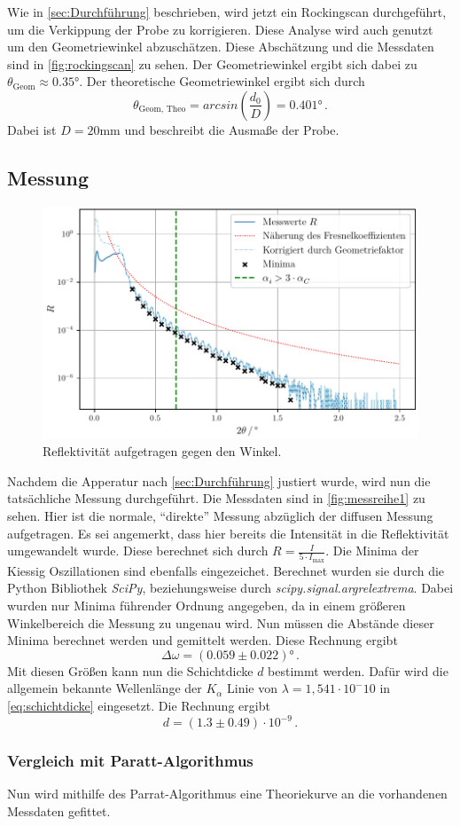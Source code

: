 Wie in \autoref{sec:Durchführung} beschrieben, wird jetzt ein Rockingscan durchgeführt, um die Verkippung der Probe zu korrigieren.
Diese Analyse wird auch genutzt um den Geometriewinkel abzuschätzen.
Diese Abschätzung und die Messdaten sind in \autoref{fig:rockingscan} zu sehen.
Der Geometriewinkel ergibt sich dabei zu $\theta_\text{Geom} \approx 0.35 °$.
Der theoretische Geometriewinkel ergibt sich durch 
\begin{equation*}
    \theta_\text{Geom, Theo} = arcsin\left(\frac{d_0}{D}\right) = 0.401 \unit\degree \, .
\end{equation*}
Dabei ist $D = 20 \unit{\milli\meter}$ und beschreibt die Ausmaße der Probe.

\subsection{Messung}

\begin{figure}
    \centering
    \includegraphics[width = 0.5 \linewidth]{build/messung1.pdf}
    \caption{Reflektivität aufgetragen gegen den Winkel.}
    \label{fig:messreihe1}
\end{figure}

Nachdem die Apperatur nach \autoref{sec:Durchführung} justiert wurde, wird nun die tatsächliche Messung durchgeführt.
Die Messdaten sind in \autoref{fig:messreihe1} zu sehen.
Hier ist die normale, \enquote{direkte} Messung abzüglich der diffusen Messung aufgetragen.
Es sei angemerkt, dass hier bereits die Intensität in die Reflektivität umgewandelt wurde.
Diese berechnet sich durch $R = \frac{I}{ 5 \cdot I_\text{max}}$.
Die Minima der Kiessig Oszillationen sind ebenfalls eingezeichet.
Berechnet wurden sie durch die Python Bibliothek \textit{SciPy}, beziehungsweise durch \textit{scipy.signal.argrelextrema}.
Dabei wurden nur Minima führender Ordnung angegeben, da in einem größeren Winkelbereich die Messung zu ungenau wird.
Nun müssen die Abstände dieser Minima berechnet werden und gemittelt werden.
Diese Rechnung ergibt
\begin{equation*}
    \Delta \omega = (0.059 \pm 0.022) \unit\degree \, .
\end{equation*}
Mit diesen Größen kann nun die Schichtdicke $d$ bestimmt werden.
Dafür wird die allgemein bekannte Wellenlänge der $K_\alpha$ Linie von $\lambda = 1, 541 \cdot 10^-10$ in \autoref{eq:schichtdicke} eingesetzt.
Die Rechnung ergibt
\begin{equation*}
    d = (1.3 \pm 0.49) \cdot 10^{-9} \, .
\end{equation*}

\subsubsection{Vergleich mit Paratt-Algorithmus}
Nun wird mithilfe des Parrat-Algorithmus eine Theoriekurve an die vorhandenen Messdaten gefittet.
